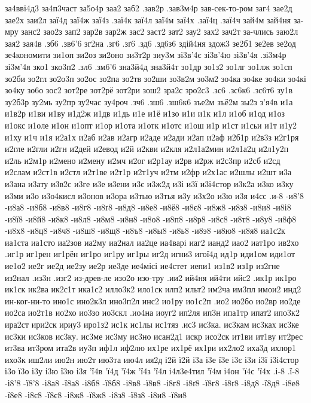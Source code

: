 {{за4вві4д3
за4п3част
за5о4р
заа2
заб2
.зав2р
.зав3м4р
зав-сек-то-ром
заг4
зае2д
зае2х
заи2л
заї4д
заї4ж
заї4з
.заї4к
заї4л
заї4м
заї4х
.заї4ц
.заї4ч
зай4м
зай4ня
за-мру
занс2
зао2з
зап2
зар2в
зар2ж
зас2
заст2
зат2
зау2
зах2
зач2т
за-члись
заю2л
зая2
зая4в
.зб6
.зв6'6
зг2на
.зг6
.зґ6
.зд6
.зд6з6
здій4ня
здож3
зе2б1
зе2ев
зе2од
зе4кономити
зи1оп
зи2оз
зи2оно
зи3т2р
зиу3м
зі3в'4є
зі3в'4ю
зі3в'4я
.зі3м4р
зі3м'4я
зко1
зко3п2
.зл6
.зм6'6
зна3й4д
зна3й4т
зо1др
зо1з2
зо1лг
зо1лж
зо1сп
зо2би
зо2гл
зо2о3п
зо2ос
зо2па
зо2тв
зо2ши
зо3в2м
зо3м2
зо4ка
зо4ке
зо4ки
зо4кі
зо4ку
зо6о
зос2
зот2ре
зот2рё
зот2ри
зош2
зра2с
зро2с3
.зс6
.зс6к6
.зс6т6
зу1в
зу2б3р
зу2мь
зу2пр
зу2час
зу4роч
.зч6
.зш6
.зш6к6
зъе2м
зъё2м
зы2з
з'я4в
и1а
и1в2р
и1ви
и1ву
и1д2ж
и1дв
и1дь
и1е
и1ё
и1зо
и1и
и1к
и1л
и1об
и1од
и1оз
и1окс
и1оле
и1он
и1опт
и1ор
и1ота
и1отк
и1отс
и1ош
и1р
и1ст
и1сьи
и1т
и1у2
и1ху
и1ч
и1я
и2а1х
и2аб
и2ав
и2агр
и2аде
и2ади
и2ап
и2аф
и2б1р
и2в3з
и2г1ря
и2гле
и2гли
и2гн
и2дей
и2евод
и2й
и2кви
и2кля
и2л1а2мин
и2л1а2ц
и2л1у2п
и2ль
и2м1р
и2мено
и2мену
и2мч
и2ог
и2р1ау
и2рв
и2рж
и2с3пр
и2сб
и2сд
и2слам
и2ст1в
и2стл
и2т1ве
и2т1р
и2т1уч
и2тм
и2фр
и2х1ас
и2шлы
и2шт
и3а
и3ана
и3ату
и3в2с
и3ге
и3е
и3ени
и3є
и3ж2д
и3і
и3ї
и3і4стор
и3к2а
и3ко
и3ку
и3ми
и3о
и3о4кисл
и3онов
и3ора
и3тью
и3тья
и3у
и3х2о
и3ю
и3я
и4сс
.и-8
-и8'8
-и8а8
-и8б8
-и8в8
-и8г8
-и8ґ8
-и8д8
-и8е8
-и8ё8
-и8є8
-и8ж8
-и8з8
-и8и8
-и8і8
-и8ї8
-и8й8
-и8к8
-и8л8
-и8м8
-и8н8
-и8о8
-и8п8
-и8р8
-и8с8
-и8т8
-и8у8
-и8ф8
-и8х8
-и8ц8
-и8ч8
-и8ш8
-и8щ8
-и8ъ8
-и8ы8
-и8ь8
-и8э8
-и8ю8
-и8я8
иа1с2к
иа1ста
иа1сто
иа2зов
иа2му
иа2нал
иа2це
иа4варі
иаг2
ианд2
иао2
иат1ро
ив2хо
.иг1р
иг1рен
иг1рён
иг1ро
иг1ру
иг1ры
иг2д
игни3
игої4д
ид1р
иди1ом
иди1от
ие1о2
ие2г
ие2д
ие2зу
ие2р
ие3де
ие4місі
ие4стет
иепи1
из1в2
из1р
из2гне
из2нал
.из3н
.изг2
из-древ-ле
изо2о
изо-тру
.ии2
ий4ня
ий4ти
ийс2
.ик1р
ик1ро
ик1ск
ик2ва
ик2с1т
ика1с2
илло3к2
ило1ск
илп2
ильт2
им2ча
им3пл
имои2
инд2
ин-ког-ни-то
ино1с
ино2к3л
ино3п2л
инс2
ио1ру
ио1с2п
.ио2
ио2бо
ио2вр
ио2де
ио2са
ио2т1в
ио2хо
ио3зо
ио3скл
.ио4на
иоуг2
ип2ля
ип3н
ипа1тр
ипат2
ипо3к2
ира2ст
ири2ск
ириу3
иро1з2
ис1к
ис1лы
ис1тяз
.ис3
ис3ка.
ис3кам
ис3ках
ис3ке
ис3ки
ис3ков
ис3ку.
ис3ме
ис3му
ис3но
исан2д1
искр
исо2ск
ит1ви
ит1ву
ит2рес
ит3ва
ит3ром
ита2в
иу3п
иф1л
иф2лю
их1ре
их1рё
их1ри
их2ло2
иха3д
ихлор1
ихо3к
иш2ли
ию2н
ию2т
ию3та
ию4л
ия2д
і2й
ї2й
і3а
і3е
ї3е
і3є
і3и
і3ї
і3і4стор
і3о
ї3о
і3у
і3ю
ї3ю
і3я
'ї4в
'ї4д
'ї4ж
'ї4з
'ї4л
і4л3е4тил
'ї4м
і4он
'ї4с
'ї4х
.і-8
.ї-8
-і8'8
-ї8'8
-і8а8
-ї8а8
-і8б8
-ї8б8
-і8в8
-ї8в8
-і8г8
-і8ґ8
-ї8г8
-ї8ґ8
-і8д8
-ї8д8
-і8е8
-ї8е8
-і8є8
-ї8є8
-і8ж8
-ї8ж8
-і8з8
-ї8з8
-і8и8
-ї8и8
}}
